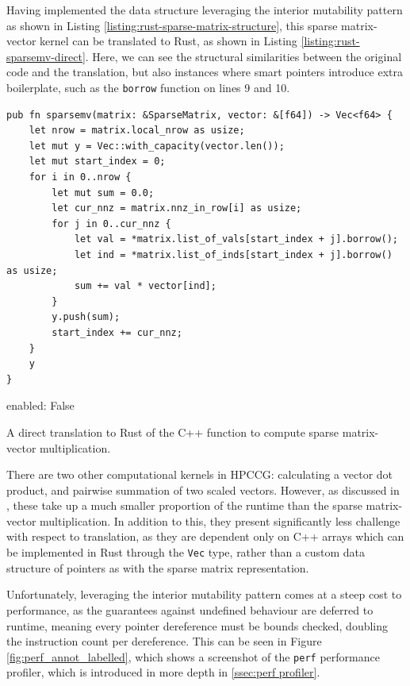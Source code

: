 Having implemented the data structure leveraging the interior mutability pattern as shown in Listing \ref{listing:rust-sparse-matrix-structure}, this sparse matrix-vector kernel can be translated to Rust, as shown in Listing \ref{listing:rust-sparsemv-direct}. Here, we can see the structural similarities between the original code and the translation, but also instances where smart pointers introduce extra boilerplate, such as the \texttt{borrow} function on lines 9 and 10.

\begin{listing}[H]
    \begin{verbatim}
pub fn sparsemv(matrix: &SparseMatrix, vector: &[f64]) -> Vec<f64> {
    let nrow = matrix.local_nrow as usize;
    let mut y = Vec::with_capacity(vector.len());
    let mut start_index = 0;
    for i in 0..nrow {
        let mut sum = 0.0;
        let cur_nnz = matrix.nnz_in_row[i] as usize;
        for j in 0..cur_nnz {
            let val = *matrix.list_of_vals[start_index + j].borrow();
            let ind = *matrix.list_of_inds[start_index + j].borrow() as usize;
            sum += val * vector[ind];
        }
        y.push(sum);
        start_index += cur_nnz;
    }
    y
}
    \end{verbatim}
    enabled: False
    \caption{A direct translation to Rust of the C++ function to compute sparse matrix-vector multiplication.}
    \label{listing:rust-sparsemv-direct}
\end{listing}

There are two other computational kernels in HPCCG: calculating a vector dot product, and pairwise summation of two scaled vectors. However, as discussed in , these take up a much smaller proportion of the runtime than the sparse matrix-vector multiplication. In addition to this, they present significantly less challenge with respect to translation, as they are dependent only on C++ arrays which can be implemented in Rust through the \texttt{Vec} type, rather than a custom data structure of pointers as with the sparse matrix representation.

Unfortunately, leveraging the interior mutability pattern comes at a steep cost to performance, as the guarantees against undefined behaviour are deferred to runtime, meaning every pointer dereference must be bounds checked, doubling the instruction count per dereference. This can be seen in Figure \ref{fig:perf_annot_labelled}, which shows a screenshot of the \texttt{perf} performance profiler, which is introduced in more depth in \ref{ssec:perf profiler}.

